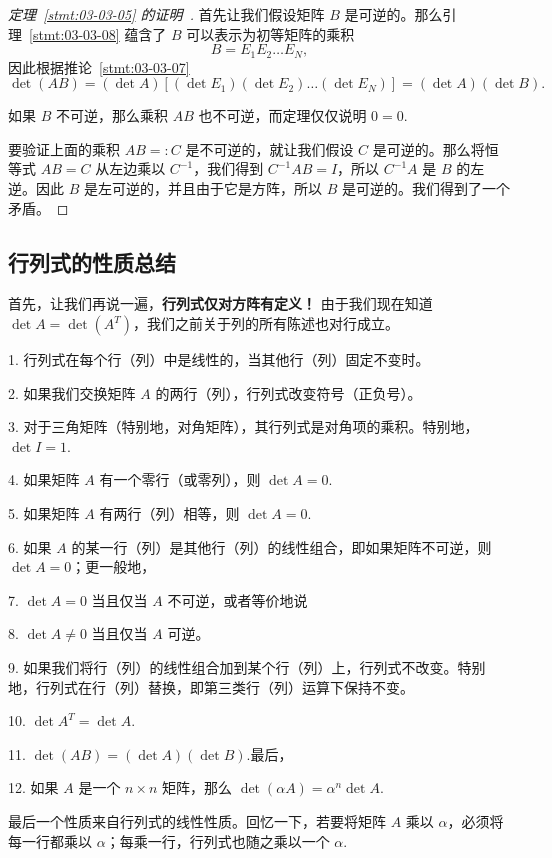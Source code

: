 \begin{proof}[\normalfont\heiti 定理~\ref{stmt:03-03-05} 的证明~\nopunct]首先让我们假设矩阵 $B$ 是可逆的。那么引理~\ref{stmt:03-03-08} 蕴含了 $B$ 可以表示为初等矩阵的乘积
$$B = E_1 E_2 \dots E_N,$$
因此根据推论~\ref{stmt:03-03-07}
$$\det(AB) = (\det A)\left[(\det E_1)(\det E_2) \dots (\det E_N)\right] = (\det A)(\det B).$$

如果 $B$ 不可逆，那么乘积 $AB$ 也不可逆，而定理仅仅说明 $0 = 0$.~

要验证上面的乘积 $AB =: C$ 是不可逆的，就让我们假设 $C$ 是可逆的。那么将恒等式 $AB = C$ 从左边乘以 $C^{-1}$，我们得到 $C^{-1} AB = I$，所以 $C^{-1} A$ 是 $B$ 的左逆。因此 $B$ 是左可逆的，并且由于它是方阵，所以 $B$ 是可逆的。我们得到了一个矛盾。\end{proof}

\subsection{行列式的性质总结}\label{sec:03-03-06}

首先，让我们再说一遍，\textbf{行列式仅对方阵有定义！} 由于我们现在知道 $\det A = \det(A^T)$，我们之前关于列的所有陈述也对行成立。

1. 行列式在每个行（列）中是线性的，当其他行（列）固定不变时。

2. 如果我们交换矩阵 $A$ 的两行（列），行列式改变符号（正负号）。

3. 对于三角矩阵（特别地，对角矩阵），其行列式是对角项的乘积。特别地，$\det I = 1$.~

4. 如果矩阵 $A$ 有一个零行（或零列），则 $\det A = 0$.~

5. 如果矩阵 $A$ 有两行（列）相等，则 $\det A = 0$.~

6. 如果 $A$ 的某一行（列）是其他行（列）的线性组合，即如果矩阵不可逆，则 $\det A = 0$；更一般地，

7. $\det A = 0$ 当且仅当 $A$ 不可逆，或者等价地说

8. $\det A \neq 0$ 当且仅当 $A$ 可逆。

9. 如果我们将行（列）的线性组合加到某个行（列）上，行列式不改变。特别地，行列式在行（列）替换，即第三类行（列）运算下保持不变。

10. $\det A^T = \det A$.~

11. $\det(AB) = (\det A)(\det B)$.最后，

12. 如果 $A$ 是一个 $n \times n$ 矩阵，那么 $\det( \alpha A ) = \alpha^n \det A$.

最后一个性质来自行列式的线性性质。回忆一下，若要将矩阵 $A$ 乘以 $\alpha$，必须将每一行都乘以 $\alpha$；每乘一行，行列式也随之乘以一个 $\alpha$.~

